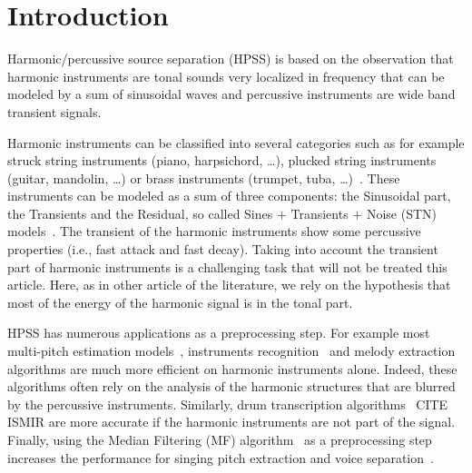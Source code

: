 \section{Introduction}
\label{sec:intro}


Harmonic/percussive source separation (HPSS) is based on the observation that harmonic instruments are tonal sounds very localized in frequency that can be modeled by a sum of sinusoidal waves and percussive instruments are wide band transient signals.

Harmonic instruments can be classified into several categories such as for example struck string instruments (piano, harpsichord, \ldots), plucked string instruments (guitar, mandolin, \ldots) or brass instruments (trumpet, tuba, \ldots)~\cite{peeters2003automatic}. These instruments can be modeled as a sum of three components: the Sinusoidal part, the Transients and the Residual, so called  Sines + Transients + Noise (STN) models~\cite{daudet2006review}. The transient of the harmonic instruments show some percussive properties (i.e., fast attack and fast decay). Taking into account the transient part of harmonic instruments is a challenging task that will not be treated this article. Here, as in other article of the literature, we rely on the hypothesis that most of the energy of the harmonic signal is in the tonal part. 


HPSS has numerous applications as a preprocessing step. For example most multi-pitch estimation models~\cite{klapuri2008multipitch}, instruments recognition~\cite{eronen2000musical} and melody extraction~\cite{salamon2012melody,rigaudISMIR2016} algorithms are much more efficient on harmonic instruments alone. Indeed, these algorithms often rely on the analysis of the harmonic structures that are blurred by the percussive instruments. Similarly, drum transcription algorithms~\cite{paulus2005drum} CITE ISMIR are more accurate if the harmonic instruments are not part of the signal. Finally, using the Median Filtering (MF) algorithm~\cite{fitzgerald2010harmonic} as a preprocessing step increases the performance for singing pitch extraction and voice separation~\cite{hsu2012tandem}. 


